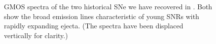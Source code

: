 \begin{figure}
\caption{GMOS spectra of the two historical SNe we have recovered in \gal.  Both show the broad emission lines characteristic of young SNRs with rapidly expanding ejecta.  (The spectra have been displaced vertically for clarity.) \label{historical_SNe}}
\end{figure}


\vspace{5mm}









